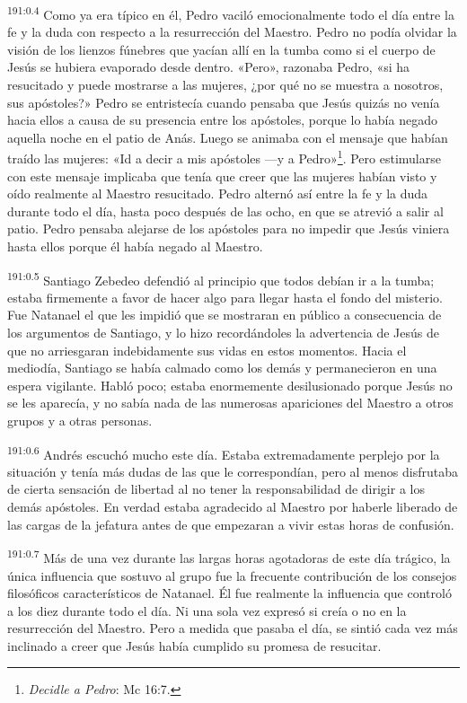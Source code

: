 \par 
\textsuperscript{191:0.4} Como ya era típico en él, Pedro vaciló emocionalmente todo el día entre la fe y la duda con respecto a la resurrección del Maestro. Pedro no podía olvidar la visión de los lienzos fúnebres que yacían allí en la tumba como si el cuerpo de Jesús se hubiera evaporado desde dentro. «Pero», razonaba Pedro, «si ha resucitado y puede mostrarse a las mujeres, ¿por qué no se muestra a nosotros, sus apóstoles?» Pedro se entristecía cuando pensaba que Jesús quizás no venía hacia ellos a causa de su presencia entre los apóstoles, porque lo había negado aquella noche en el patio de Anás. Luego se animaba con el mensaje que habían traído las mujeres: «Id a decir a mis apóstoles ---y a Pedro»\footnote{\textit{Decidle a Pedro}: Mc 16:7.}. Pero estimularse con este mensaje implicaba que tenía que creer que las mujeres habían visto y oído realmente al Maestro resucitado. Pedro alternó así entre la fe y la duda durante todo el día, hasta poco después de las ocho, en que se atrevió a salir al patio. Pedro pensaba alejarse de los apóstoles para no impedir que Jesús viniera hasta ellos porque él había negado al Maestro.

\par 
\textsuperscript{191:0.5} Santiago Zebedeo defendió al principio que todos debían ir a la tumba; estaba firmemente a favor de hacer algo para llegar hasta el fondo del misterio. Fue Natanael el que les impidió que se mostraran en público a consecuencia de los argumentos de Santiago, y lo hizo recordándoles la advertencia de Jesús de que no arriesgaran indebidamente sus vidas en estos momentos. Hacia el mediodía, Santiago se había calmado como los demás y permanecieron en una espera vigilante. Habló poco; estaba enormemente desilusionado porque Jesús no se les aparecía, y no sabía nada de las numerosas apariciones del Maestro a otros grupos y a otras personas.

\par 
\textsuperscript{191:0.6} Andrés escuchó mucho este día. Estaba extremadamente perplejo por la situación y tenía más dudas de las que le correspondían, pero al menos disfrutaba de cierta sensación de libertad al no tener la responsabilidad de dirigir a los demás apóstoles. En verdad estaba agradecido al Maestro por haberle liberado de las cargas de la jefatura antes de que empezaran a vivir estas horas de confusión.

\par 
\textsuperscript{191:0.7} Más de una vez durante las largas horas agotadoras de este día trágico, la única influencia que sostuvo al grupo fue la frecuente contribución de los consejos filosóficos característicos de Natanael. Él fue realmente la influencia que controló a los diez durante todo el día. Ni una sola vez expresó si creía o no en la resurrección del Maestro. Pero a medida que pasaba el día, se sintió cada vez más inclinado a creer que Jesús había cumplido su promesa de resucitar.

